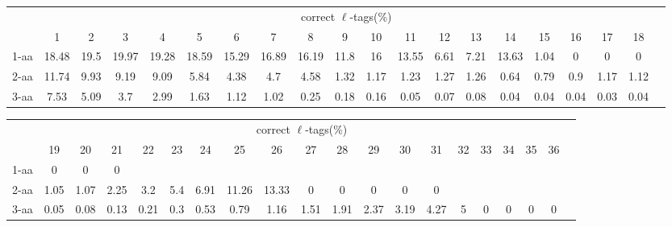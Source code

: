 \documentclass{article}[12pt]
\begin{document}
\begin{landscape}

\begin{table}[h]\tiny
\vspace{3mm}
{\centering
\begin{center}
\begin{tabular}{|l|c|c|c|c|c|c|c|c|c|c|c|c|c|c|c|c|c|c|c|}
  \hline
  & \multicolumn{ 18 }{|c|}{correct $\ell$-tags(\%)} \\
  \cline{2- 19}
    & 1 & 2 & 3 & 4 & 5 & 6 & 7 & 8 & 9 & 10 & 11 & 12 & 13 & 14 & 15 & 16 & 17 & 18\\
  \hline
1-aa  & 18.48 & 19.5 & 19.97 & 19.28 & 18.59 & 15.29 & 16.89 & 16.19 & 11.8 & 16 & 13.55 & 6.61 & 7.21 & 13.63 & 1.04 & 0 & 0 & 0\\
2-aa  & 11.74 & 9.93 & 9.19 & 9.09 & 5.84 & 4.38 & 4.7 & 4.58 & 1.32 & 1.17 & 1.23 & 1.27 & 1.26 & 0.64 & 0.79 & 0.9 & 1.17 & 1.12\\
3-aa  & 7.53 & 5.09 & 3.7 & 2.99 & 1.63 & 1.12 & 1.02 & 0.25 & 0.18 & 0.16 & 0.05 & 0.07 & 0.08 & 0.04 & 0.04 & 0.04 & 0.03 & 0.04\\
 \hline
\end{tabular}
\end{center}
\par}
\centering

\vspace{3mm}
\end{table}
\begin{table}[h]\tiny
\vspace{3mm}
{\centering
\begin{center}
\begin{tabular}{|l|c|c|c|c|c|c|c|c|c|c|c|c|c|c|c|c|c|c|c|}
  \hline
  & \multicolumn{ 18 }{|c|}{correct $\ell$-tags(\%)} \\
  \cline{2- 19}
    & 19 & 20 & 21 & 22 & 23 & 24 & 25 & 26 & 27 & 28 & 29 & 30 & 31 & 32 & 33 & 34 & 35 & 36\\
  \hline
1-aa  & 0 & 0 & 0 &  &  &  &  &  &  &  &  &  &  &  &  &  &  & \\
2-aa  & 1.05 & 1.07 & 2.25 & 3.2 & 5.4 & 6.91 & 11.26 & 13.33 & 0 & 0 & 0 & 0 & 0 &  &  &  &  & \\
3-aa  & 0.05 & 0.08 & 0.13 & 0.21 & 0.3 & 0.53 & 0.79 & 1.16 & 1.51 & 1.91 & 2.37 & 3.19 & 4.27 & 5 & 0 & 0 & 0 & 0\\
 \hline
\end{tabular}
\end{center}
\par}
\centering


\end{table}
\end{landscape}
\end{document}
